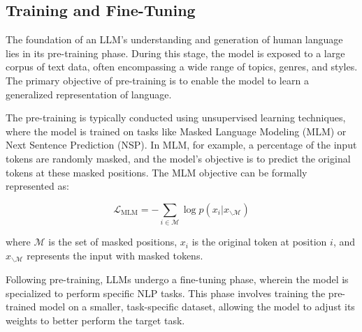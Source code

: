 
            \subsection{Training and Fine-Tuning}
            The foundation of an LLM's understanding and generation of human language lies in its pre-training phase. During this stage, the model is exposed to a large corpus of text data, often encompassing a wide range of topics, genres, and styles. The primary objective of pre-training is to enable the model to learn a generalized representation of language.
            
            The pre-training is typically conducted using unsupervised learning techniques, where the model is trained on tasks like Masked Language Modeling (MLM) or Next Sentence Prediction (NSP). In MLM, for example, a percentage of the input tokens are randomly masked, and the model's objective is to predict the original tokens at these masked positions. The MLM objective can be formally represented as:
            
            \begin{equation}
            \mathcal{L}_{\text{MLM}} = -\sum_{i \in \mathcal{M}} \log p(x_i | x_{\backslash \mathcal{M}})
            \end{equation}
            
            where $\mathcal{M}$ is the set of masked positions, $x_i$ is the original token at position $i$, and $x_{\backslash \mathcal{M}}$ represents the input with masked tokens.
            \vspace*{0.2cm}

            Following pre-training, LLMs undergo a fine-tuning phase, wherein the model is specialized to perform specific NLP tasks. This phase involves training the pre-trained model on a smaller, task-specific dataset, allowing the model to adjust its weights to better perform the target task.
            
